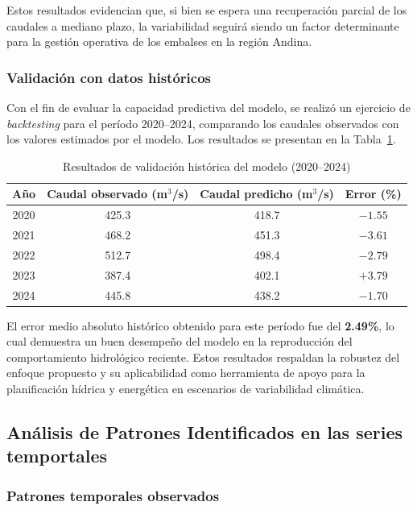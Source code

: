 Estos resultados evidencian que, si bien se espera una recuperación parcial de los caudales a mediano plazo, la variabilidad seguirá siendo un factor determinante para la gestión operativa de los embalses en la región Andina.

\subsubsection{Validación con datos históricos}

Con el fin de evaluar la capacidad predictiva del modelo, se realizó un ejercicio de \textit{backtesting} para el período 2020--2024, comparando los caudales observados con los valores estimados por el modelo. Los resultados se presentan en la Tabla~\ref{tab:backtesting}.

\begin{table}[H]
\centering
\caption{Resultados de validación histórica del modelo (2020--2024)}
\label{tab:backtesting}
\begin{tabular}{c c c c}
\hline
\textbf{Año} & \textbf{Caudal observado (m$^3$/s)} & \textbf{Caudal predicho (m$^3$/s)} & \textbf{Error (\%)} \\
\hline
2020 & 425.3 & 418.7 & $-1.55$ \\
2021 & 468.2 & 451.3 & $-3.61$ \\
2022 & 512.7 & 498.4 & $-2.79$ \\
2023 & 387.4 & 402.1 & $+3.79$ \\
2024 & 445.8 & 438.2 & $-1.70$ \\
\hline
\end{tabular}
\end{table}

El error medio absoluto histórico obtenido para este período fue del \textbf{2.49\%}, lo cual demuestra un buen desempeño del modelo en la reproducción del comportamiento hidrológico reciente. Estos resultados respaldan la robustez del enfoque propuesto y su aplicabilidad como herramienta de apoyo para la planificación hídrica y energética en escenarios de variabilidad climática.

\subsection{Análisis de Patrones Identificados en las series temportales}

\subsubsection*{Patrones temporales observados}

